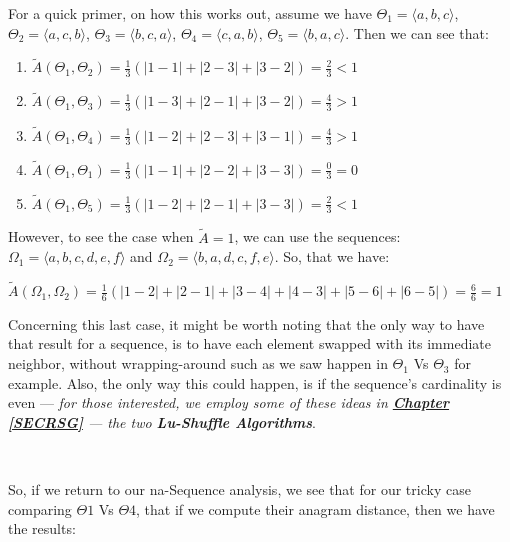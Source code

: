 \documentclass[a4paper, 18pt]{book} %
\begin{document}
\begin{center}
{\begin{minipage}{0.9\textwidth}
\begin{itemize}
{For a quick primer, on how this works out, assume we have $\Theta_1=\langle a, b, c\rangle$, $\Theta_2=\langle a, c, b\rangle$, $\Theta_3=\langle b, c, a\rangle$, $\Theta_4=\langle c, a, b\rangle$, $\Theta_5=\langle b, a, c\rangle$. Then we can see that:

\begin{enumerate}
\item $\tilde{A}(\Theta_1,\Theta_2) = \frac{1}{3}(|1-1|+|2-3|+|3-2|) = \frac{2}{3} < 1$
\item $\tilde{A}(\Theta_1,\Theta_3) = \frac{1}{3}(|1-3|+|2-1|+|3-2|) = \frac{4}{3} > 1$
\item $\tilde{A}(\Theta_1,\Theta_4) = \frac{1}{3}(|1-2|+|2-3|+|3-1|) = \frac{4}{3} > 1$
\item $\tilde{A}(\Theta_1,\Theta_1) = \frac{1}{3}(|1-1|+|2-2|+|3-3|) = \frac{0}{3} = 0$
\item $\tilde{A}(\Theta_1,\Theta_5) = \frac{1}{3}(|1-2|+|2-1|+|3-3|) = \frac{2}{3} < 1$
\end{enumerate}   

However, to see the case when $\tilde{A} = 1$, we can use the sequences: $\Omega_1 = \langle a, b, c, d, e, f \rangle$ and $\Omega_2 = \langle b, a, d, c, f, e \rangle$. So, that we have:

 $\tilde{A}(\Omega_1,\Omega_2) = \frac{1}{6}(|1-2|+|2-1|+|3-4|+|4-3|+|5-6|+|6-5|) = \frac{6}{6} = 1$
 
 Concerning this last case, it might be worth noting that the only way to have that result for a sequence, is to have each element swapped with its immediate neighbor, without wrapping-around such as we saw happen in $\Theta_1$ Vs $\Theta_3$ for example. Also, the only way this could happen, is if the sequence's cardinality is even --- \textit{for those interested, we employ some of these ideas in \textbf{\hyperref[SECRSG]{Chapter \ref{SECRSG}}} --- the two \textbf{Lu-Shuffle Algorithms}}.

}
\end{itemize}

\end{minipage}}
\\
\end{center}

So, if we return to our na-Sequence analysis, we see that for our tricky case comparing $\Theta1$ Vs $\Theta4$, that if we compute their anagram distance, then we have the results:
\end{document}
